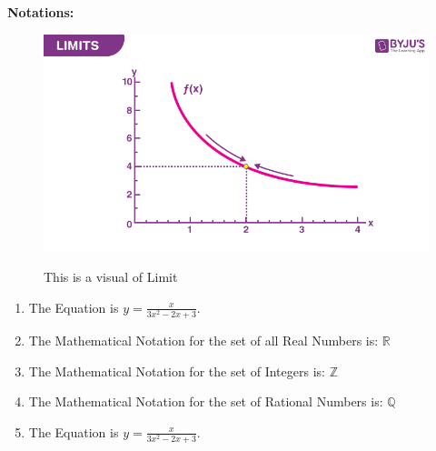 \documentclass[15pt, a5paper]{article}
\def \eqn{y=\frac{x}{3x^2-2x+3}} %
\begin{document}
\textbf{Notations: }\\

\begin{figure}[H]
    \centering
    \includegraphics[width=0.5\linewidth]{Limits.png}\\
    \caption{This is a visual of Limit}
\end{figure}

\begin{enumerate}
    \item The Equation is $\eqn$.
    \item The Mathematical Notation for the set of all Real Numbers is: $\mathbb{R}$
    \item The Mathematical Notation for the set of Integers is: $\mathbb{Z}$
    \item The Mathematical Notation for the set of Rational Numbers is: $\mathbb{Q}$
    \item The Equation is $\eqn$.
\end{enumerate}
\end{document}
